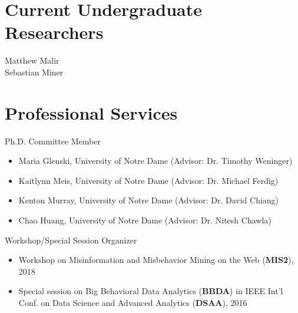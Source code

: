 \documentclass[margin, 9pt]{res}
\begin{document}
\begin{resume}
\section{Current Undergraduate Researchers}

{Matthew Malir} \\
{Sebastian Miner}

\section{Professional Services}

{Ph.D. Committee Member}
\begin{itemize}
\item Maria Glenski, University of Notre Dame (Advisor: Dr. Timothy Weninger)
\item Kaitlynn Meis, University of Notre Dame (Advisor: Dr. Michael Ferdig)
\item Kenton Murray, University of Notre Dame (Advisor: Dr. David Chiang)	
\item Chao Huang, University of Notre Dame (Advisor: Dr. Nitesh Chawla)
\end{itemize}
\vspace{-0.1in}

{Workshop/Special Session Organizer}
\begin{itemize}
\item Workshop on Misinformation and Misbehavior Mining on the Web (\textbf{MIS2}), 2018
\item Special session on Big Behavioral Data Analytics (\textbf{BBDA})
	in IEEE Int'l Conf. on Data Science and Advanced Analytics (\textbf{DSAA}), 2016
\end{itemize}
\vspace{-0.1in}


\end{resume}
\end{document}
